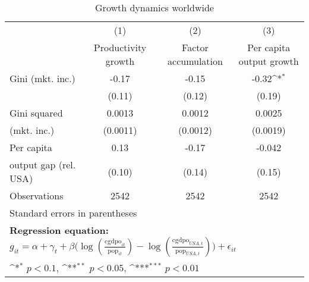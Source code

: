 \begin{sidewaystable}[htbp]\centering
\def\sym#1{\ifmmode^{#1}\else\(^{#1}\)\fi}
\caption{Growth dynamics worldwide}
\begin{tabular}{l*{3}{c}}
\hline\hline
                &\multicolumn{1}{c}{(1)}&\multicolumn{1}{c}{(2)}&\multicolumn{1}{c}{(3)}\\
                &\multicolumn{1}{c}{Productivity growth}&\multicolumn{1}{c}{Factor accumulation}&\multicolumn{1}{c}{Per capita output growth}\\
\hline
Gini (mkt. inc.)&    -0.17         &    -0.15         &    -0.32\sym{*}  \\
                &   (0.11)         &   (0.12)         &   (0.19)         \\
[1em]
Gini squared    &   0.0013         &   0.0012         &   0.0025         \\
(mkt. inc.)     & (0.0011)         & (0.0012)         & (0.0019)         \\
[1em]
Per capita      &     0.13         &    -0.17         &   -0.042         \\
output gap (rel. USA)&   (0.10)         &   (0.14)         &   (0.15)         \\
\hline
Observations    &     2542         &     2542         &     2542         \\
\hline\hline
\multicolumn{4}{l}{\footnotesize Standard errors in parentheses}\\
\multicolumn{4}{l}{\footnotesize \textbf{Regression equation:} \(g_{it} = \alpha + \gamma_t + \beta \big(\log (\frac{\textrm{cgdpo}_{it}}{\textrm{pop}_{it}} ) - \log (\frac{\textrm{cgdpo}_{USA,t}}{\textrm{pop}_{USA,t}}  ) \big) + \epsilon_{it}\)}\\
\multicolumn{4}{l}{\footnotesize \sym{*} \(p<0.1\), \sym{**} \(p<0.05\), \sym{***} \(p<0.01\)}\\
\end{tabular}
\end{sidewaystable}
